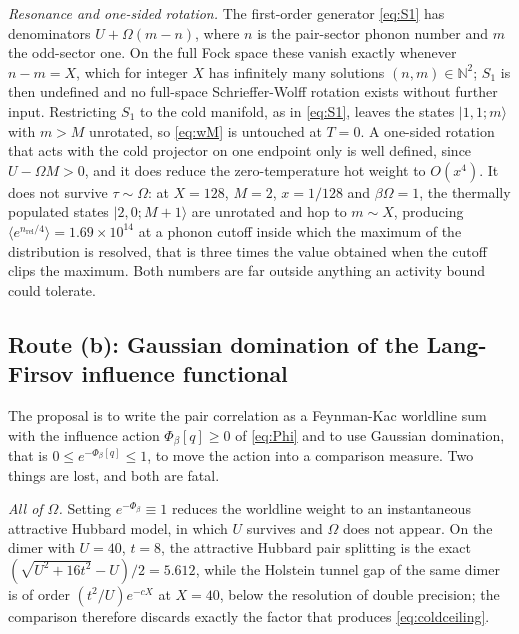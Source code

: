 \documentclass[11pt]{article}
\theoremstyle{definition}
\theoremstyle{remark}
\newcommand{\N}{\mathbb{N}}
\begin{document}
\emph{Resonance and one-sided rotation.} The first-order generator
\eqref{eq:S1} has denominators $U+\Omega(m-n)$, where $n$ is the pair-sector
phonon number and $m$ the odd-sector one. On the full Fock space these vanish
exactly whenever $n-m=X$, which for integer $X$ has infinitely many solutions
$(n,m)\in\N^{2}$; $S_{1}$ is then undefined and no full-space Schrieffer-Wolff rotation
exists without further input. Restricting $S_{1}$ to the cold manifold, as in
\eqref{eq:S1}, leaves the states $|1,1;m\rangle$ with $m>M$ unrotated, so
\eqref{eq:wM} is untouched at $T=0$. A one-sided rotation that acts with the cold
projector on one endpoint only is well defined, since $U-\Omega M>0$, and it does
reduce the zero-temperature hot weight to $O(x^{4})$. It does not survive
$\tau\sim\Omega$: at $X=128$, $M=2$, $x=1/128$ and $\beta\Omega=1$, the
thermally populated states $|2,0;M+1\rangle$ are unrotated and hop to $m\sim X$,
producing $\langle e^{n_{\mathrm{rel}}/4}\rangle=1.69\times10^{14}$ at a phonon
cutoff inside which the maximum of the distribution is resolved, that is three
times the value obtained when the cutoff clips the maximum. Both numbers are far
outside anything an activity bound could tolerate.

\subsection{Route (b): Gaussian domination of the Lang-Firsov influence
functional}\label{sub:routeb}

The proposal is to write the pair correlation as a Feynman-Kac worldline sum
with the influence action $\Phi_{\beta}[q]\ge0$ of
\eqref{eq:Phi} and to use Gaussian domination, that is
$0\le e^{-\Phi_{\beta}[q]}\le1$, to move the action into a comparison measure.
Two things are lost, and both are fatal.

\emph{All of $\Omega$.} Setting $e^{-\Phi_{\beta}}\equiv1$ reduces the worldline
weight to an instantaneous attractive Hubbard model, in which $U$ survives and
$\Omega$ does not appear. On the dimer with $U=40$, $t=8$, the attractive Hubbard
pair splitting is the exact $(\sqrt{U^{2}+16t^{2}}-U)/2=5.612$, while the Holstein
tunnel gap of the same dimer is of order $(t^{2}/U)e^{-cX}$ at $X=40$, below the
resolution of double precision; the comparison therefore discards exactly the
factor that produces \eqref{eq:coldceiling}.
\end{document}
